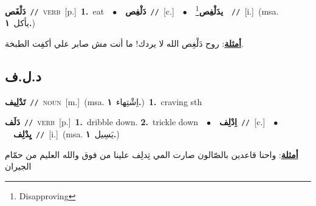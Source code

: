 \documentclass[10pt,a4paper,twoside]{article} %
\begin{document}
\begin{multicols}{2}
{\setlength\topsep{0pt}\textbf{\foreignlanguage{arabic}{دَلْغَص}}\ {\color{gray}\texttt{//}\color{black}}\ \textsc{verb}\ [p.]\ \textbf{1.}~eat\ \ $\bullet$\ \ \setlength\topsep{0pt}\textbf{\foreignlanguage{arabic}{دَلْغِص}}\ {\color{gray}\texttt{//}\color{black}}\ [c.]\ \ $\bullet$\ \ \setlength\topsep{0pt}\textbf{\foreignlanguage{arabic}{يدَلْغِص}}\footnote{Disapproving}\ \ {\color{gray}\texttt{//}\color{black}}\ [i.]\ \color{gray}(msa. \foreignlanguage{arabic}{يأكل}~\foreignlanguage{arabic}{\textbf{١.}})\color{black}\  \begin{flushright}\color{gray}\foreignlanguage{arabic}{\textbf{\underline{\foreignlanguage{arabic}{أمثلة}}}: روح دَلْغِص الله لا يردك! ما أنت مش صابر علي أكفِت الطبخة.}\end{flushright}\color{black}} \vspace{2mm}

\vspace{-3mm}
\subsection*{\color{blue}\foreignlanguage{arabic}{د.ل.ف}\color{blue}{}} 

{\setlength\topsep{0pt}\textbf{\foreignlanguage{arabic}{تَدْلِيف}}\ {\color{gray}\texttt{//}\color{black}}\ \textsc{noun}\ [m.]\ \color{gray}(msa. \foreignlanguage{arabic}{اِشْتِهاء}~\foreignlanguage{arabic}{\textbf{١.}})\color{black}\ \textbf{1.}~craving sth\ } \vspace{2mm}

{\setlength\topsep{0pt}\textbf{\foreignlanguage{arabic}{دَلَف}}\ {\color{gray}\texttt{//}\color{black}}\ \textsc{verb}\ [p.]\ \textbf{1.}~dribble down.  \textbf{2.}~trickle down\ \ $\bullet$\ \ \setlength\topsep{0pt}\textbf{\foreignlanguage{arabic}{اِدْلِف}}\ {\color{gray}\texttt{//}\color{black}}\ [c.]\ \ $\bullet$\ \ \setlength\topsep{0pt}\textbf{\foreignlanguage{arabic}{يِدْلِف}}\ {\color{gray}\texttt{//}\color{black}}\ [i.]\ \color{gray}(msa. \foreignlanguage{arabic}{يَسِيل}~\foreignlanguage{arabic}{\textbf{١.}})\color{black}\  \begin{flushright}\color{gray}\foreignlanguage{arabic}{\textbf{\underline{\foreignlanguage{arabic}{أمثلة}}}: واحنا قاعدين بالصّالون صارت المي تِدلِف علينا من فوق والله العليم من حمّام الجيران}\end{flushright}\color{black}} \vspace{2mm}


\end{multicols}
\end{document}
